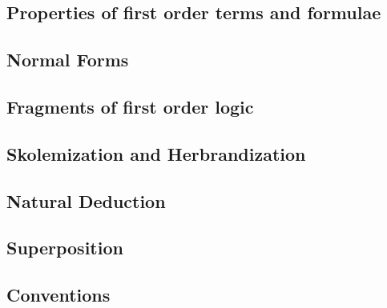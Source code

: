 \subsection{Properties of first order terms and formulae}



\subsection{Normal Forms}



\subsection{Fragments of first order logic}



\subsection{Skolemization and Herbrandization}

\subsection{Natural Deduction}\label{sec:natural:deduction}



\subsection{Superposition}



\subsection{Conventions}

